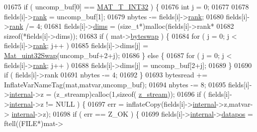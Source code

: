 \begin{DoxyCode}
{{{{{{{{{{{{{{01675                 \textcolor{keywordflow}{if} ( uncomp\_buf[0] == \hyperlink{group___m_a_t_ggacf7b3b879282b7ab3a51190e49bf3453a83e06a68320726c6572bfbb9f3addb1d}{MAT\_T\_INT32} ) \{
01676                     \textcolor{keywordtype}{int} j = 0;
01677 
01678                     fields[i]->\hyperlink{group___m_a_t_a84ba70c96ded13cc555fa75b768d9921}{rank} = uncomp\_buf[1];
01679                     nbytes -= fields[i]->\hyperlink{group___m_a_t_a84ba70c96ded13cc555fa75b768d9921}{rank};
01680                     fields[i]->\hyperlink{group___m_a_t_a84ba70c96ded13cc555fa75b768d9921}{rank} /= 4;
01681                     fields[i]->\hyperlink{group___m_a_t_a8e01234e1c862ce3472bb37f5a09b92c}{dims} = (\textcolor{keywordtype}{size\_t}*)malloc(fields[i]->rank*
01682                                              \textcolor{keyword}{sizeof}(*fields[i]->dims));
01683                     \textcolor{keywordflow}{if} ( mat->\hyperlink{struct__mat__t_a99d207977af5e04941ace56d71817a40}{byteswap} ) \{
01684                         \textcolor{keywordflow}{for} ( j = 0; j < fields[i]->\hyperlink{group___m_a_t_a84ba70c96ded13cc555fa75b768d9921}{rank}; j++ )
01685                             fields[i]->dims[j] = \hyperlink{endian_8c_a8cb0d0750e2eaf9840d95db531934f4f}{Mat\_uint32Swap}(uncomp\_buf+2+j);
01686                     \} \textcolor{keywordflow}{else} \{
01687                         \textcolor{keywordflow}{for} ( j = 0; j < fields[i]->\hyperlink{group___m_a_t_a84ba70c96ded13cc555fa75b768d9921}{rank}; j++ )
01688                             fields[i]->dims[j] = uncomp\_buf[2+j];
01689                     \}
01690                     \textcolor{keywordflow}{if} ( fields[i]->rank %
01691                         nbytes -= 4;
01692                 \}
01693                 bytesread += InflateVarNameTag(mat,matvar,uncomp\_buf);
01694                 nbytes -= 8;
01695                 fields[i]->\hyperlink{group___m_a_t_a6e97e3ed9f40c49322c18561c2a94e92}{internal}->z = (z\_streamp)calloc(1,\textcolor{keyword}{sizeof}(
      \hyperlink{structz__stream__s}{z\_stream}));
01696                 \textcolor{keywordflow}{if} ( fields[i]->\hyperlink{namespaceinternal}{internal}->z != NULL ) \{
01697                     err = inflateCopy(fields[i]->\hyperlink{namespaceinternal}{internal}->z,matvar->
      \hyperlink{group___m_a_t_a6e97e3ed9f40c49322c18561c2a94e92}{internal}->z);
01698                     \textcolor{keywordflow}{if} ( err == Z\_OK ) \{
01699                         fields[i]->\hyperlink{group___m_a_t_a6e97e3ed9f40c49322c18561c2a94e92}{internal}->\hyperlink{structmatvar__internal_afd3bfaab126a160bd6855563e1ea0a7e}{datapos} = ftell((FILE*)mat->
}}}}}}}}}}}}}}
\end{DoxyCode}
